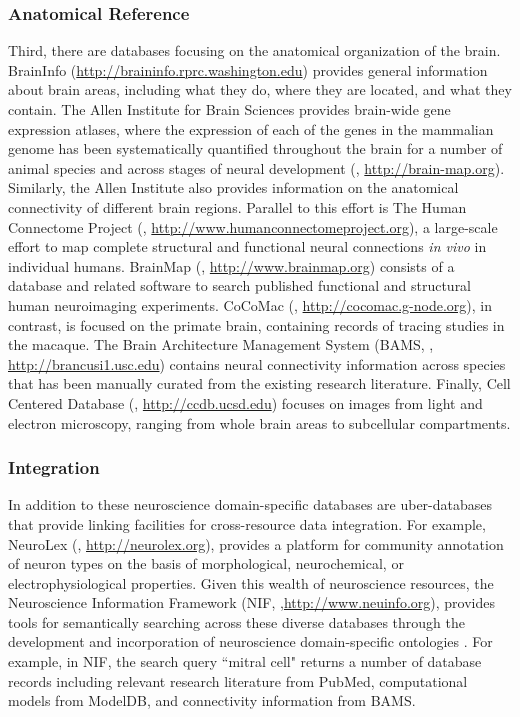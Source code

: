 \documentclass[12pt]{article}
\begin{document}
\subsubsection*{Anatomical Reference}
Third, there are databases focusing on the anatomical organization of the brain.  
BrainInfo (\url{http://braininfo.rprc.washington.edu}) provides general information about brain areas, including what they do, where they are located, and what they contain.  
The Allen Institute for Brain Sciences provides brain-wide gene expression atlases, where the expression of each of the genes in the mammalian genome has been systematically quantified throughout the brain for a number of animal species and across stages of neural development (\cite{lein_genome-wide_2007}, \url{http://brain-map.org}). 
Similarly, the Allen Institute also provides information on the anatomical connectivity of different brain regions.
Parallel to this effort is The Human Connectome Project (\cite{humanconnectomeproject_2013}, \url{http://www.humanconnectomeproject.org}), a large-scale effort to map complete structural and functional neural connections \textit{in vivo} in individual humans. 
BrainMap (\cite{brainmap_2005}, \url{http://www.brainmap.org}) consists of a database and related software to search published functional and structural human neuroimaging experiments.  
CoCoMac (\cite{cocomac_2001,cocomac_2012}, \url{http://cocomac.g-node.org}), in contrast, is focused on the primate brain, containing records of tracing studies in the macaque. 
The Brain Architecture Management System (BAMS, \cite{bota_brain_2005}, \url{http://brancusi1.usc.edu}) contains neural connectivity information across species that has been manually curated from the existing research literature.  
Finally, Cell Centered Database (\cite{cellcentered_2003,cellcentered_2009}, \url{http://ccdb.ucsd.edu}) focuses on images from light and electron microscopy, ranging from whole brain areas to subcellular compartments.  

\subsubsection*{Integration}
In addition to these neuroscience domain-specific databases are uber-databases that provide linking facilities for cross-resource data integration. 
For example, NeuroLex (\cite{larson_neurolex.org:_2013}, \url{http://neurolex.org}), provides a platform for community annotation of neuron types on the basis of morphological, neurochemical, or electrophysiological properties. 
Given this wealth of neuroscience resources, the Neuroscience Information Framework (NIF, \cite{gardner_neuroscience_2008},\url{http://www.neuinfo.org}), provides tools for semantically searching across these diverse databases through the development and incorporation of neuroscience domain-specific ontologies \cite{bug_nifstd_2008,larson_ontologies_2009,hamilton_ontological_2012,imam_development_2012}. 
For example, in NIF, the search query ``mitral cell" returns a number of database records including relevant research literature from PubMed, computational models from ModelDB, and connectivity information from BAMS.  
\end{document}
